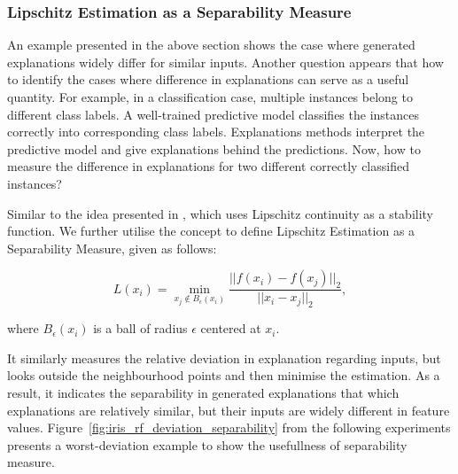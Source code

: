 \documentclass[english]{tktltiki2}
\theoremstyle{definition}
\theoremstyle{remark}
\begin{document}
\subsubsection{Lipschitz Estimation as a Separability Measure}\label{sec:lipschitz_estimation_as_a_separability_measure} %
An example presented in the above section shows the case where generated explanations widely differ for similar inputs. Another question appears that how to identify the cases where difference in explanations can serve as a useful quantity. For example, in a classification case, multiple instances belong to different class labels. A well-trained predictive model classifies the instances correctly into corresponding class labels. Explanations methods interpret the predictive model and give explanations behind the predictions. Now, how to measure the difference in explanations for two different correctly classified instances?

Similar to the idea presented in \citet{alvarez2018robustness}, which uses Lipschitz continuity as a stability function. We further utilise the concept to define Lipschitz Estimation as a Separability Measure, given as follows:

\begin{equation}\label{eq:lipschitz_estimation_as_a_separability_measure}
L(x_i) = \min_{x_j \notin B_{\epsilon}(x_i)}  \frac{||f(x_i) - f(x_j)||_{2}}{||x_i - x_j||_{2}},
\end{equation}

where $B_{\epsilon}(x_{i})$ is a ball of radius $\epsilon$ centered at $x_i$.

It similarly measures the relative deviation in explanation regarding inputs, but looks outside the neighbourhood points and then minimise the estimation. As a result, it indicates the separability in generated explanations that which explanations are relatively similar, but their inputs are widely different in feature values. Figure~\ref{fig:iris_rf_deviation_separability} from the following experiments presents a worst-deviation example to show the usefullness of separability measure.
\end{document}
